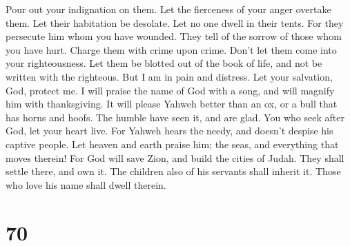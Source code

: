  Pour out your indignation on them. Let the fierceness of
your anger overtake them.  Let their habitation be
desolate. Let no one dwell in their tents.  For they
persecute him whom you have wounded. They tell of the sorrow of those
whom you have hurt.  Charge them with crime upon crime.
Don't let them come into your righteousness.  Let them be
blotted out of the book of life, and not be written with the righteous.
 But I am in pain and distress. Let your salvation, God,
protect me.  I will praise the name of God with a song,
and will magnify him with thanksgiving.  It will please
Yahweh better than an ox, or a bull that has horns and hoofs.
 The humble have seen it, and are glad. You who seek
after God, let your heart live.  For Yahweh hears the
needy, and doesn't despise his captive people.  Let
heaven and earth praise him; the seas, and everything that moves
therein!  For God will save Zion, and build the cities of
Judah. They shall settle there, and own it.  The children
also of his servants shall inherit it. Those who love his name shall
dwell therein.

\hypertarget{section-69}{%
\section{70}\label{section-69}}

